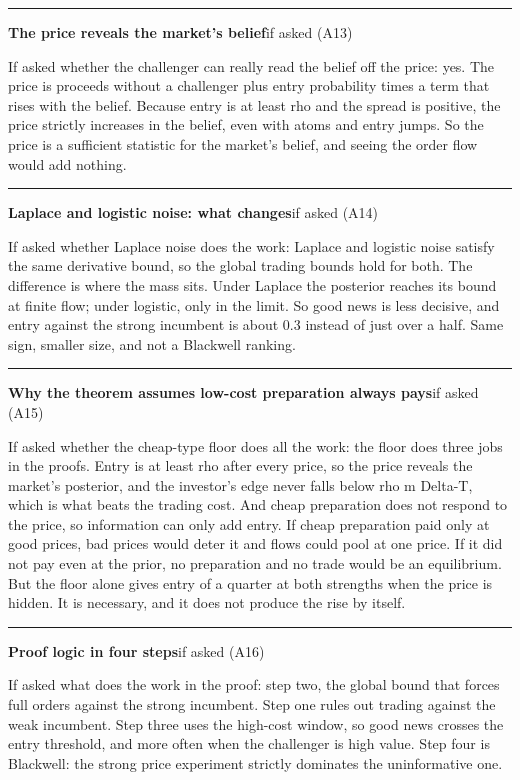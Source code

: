 \documentclass[11pt]{article}
\newcommand{\scriptframe}[3]{%
  \Needspace{9\baselineskip}%
  \par\medskip\noindent\textcolor{ScriptBlue}{\rule{\linewidth}{0.55pt}}%
  \par\smallskip\noindent
  \textbf{#1}\hfill\textcolor{ScriptGray}{\small #2}\par\smallskip
  #3\par}
\begin{document}
\scriptframe{The price reveals the market's belief}{if asked (A13)}{%
  If asked whether the challenger can really read the belief off the price: yes.
  The price is proceeds without a challenger plus entry probability times a term
  that rises with the belief. Because entry is at least rho and the spread is
  positive, the price strictly increases in the belief, even with atoms and
  entry jumps. So the price is a sufficient statistic for the market's belief,
  and seeing the order flow would add nothing.
}

\scriptframe{Laplace and logistic noise: what changes}{if asked (A14)}{%
  If asked whether Laplace noise does the work: Laplace and logistic noise
  satisfy the same derivative bound, so the global trading bounds hold for both.
  The difference is where the mass sits. Under Laplace the posterior reaches its
  bound at finite flow; under logistic, only in the limit. So good news is less
  decisive, and entry against the strong incumbent is about 0.3 instead of just
  over a half. Same sign, smaller size, and not a Blackwell ranking.
}

\scriptframe{Why the theorem assumes low-cost preparation always pays}{if asked (A15)}{%
  If asked whether the cheap-type floor does all the work: the floor does three jobs in the proofs. Entry is at least rho after every price, so the price reveals the market's posterior, and the investor's edge never falls below rho m Delta-T, which is what beats the trading cost. And cheap preparation does not respond to the price, so information can only add entry. If cheap preparation paid only at good prices, bad prices would deter it and flows could pool at one price. If it did not pay even at the prior, no preparation and no trade would be an equilibrium. But the floor alone gives entry of a quarter at both
  strengths when the price is hidden. It is necessary, and it does not produce
  the rise by itself.
}

\scriptframe{Proof logic in four steps}{if asked (A16)}{%
  If asked what does the work in the proof: step two, the global bound that
  forces full orders against the strong incumbent. Step one rules out trading
  against the weak incumbent. Step three uses the high-cost window, so good news
  crosses the entry threshold, and more often when the challenger is high value.
  Step four is Blackwell: the strong price experiment strictly dominates the
  uninformative one.
}
\end{document}
